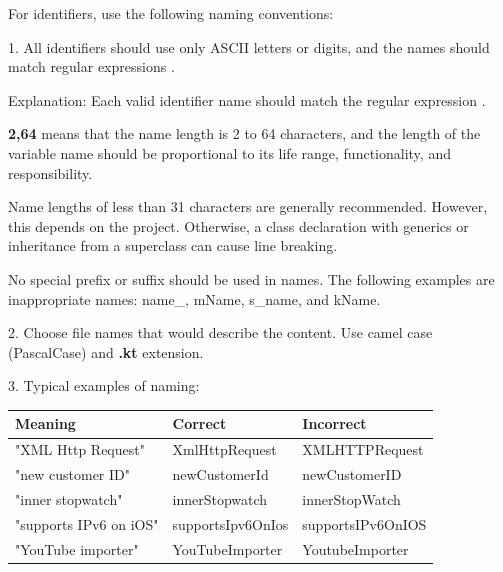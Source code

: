{{{{{{{{{{{{{{{{\label{sec:1.1.1}



For identifiers, use the following naming conventions:

1.	All identifiers should use only ASCII letters or digits, and the names should match regular expressions \textbf{}.

Explanation: Each valid identifier name should match the regular expression \textbf{}.

\textbf{{2,64}} means that the name length is 2 to 64 characters, and the length of the variable name should be proportional to its life range, functionality, and responsibility.

Name lengths of less than 31 characters are generally recommended. However, this depends on the project. Otherwise, a class declaration with generics or inheritance from a superclass can cause line breaking.

No special prefix or suffix should be used in names. The following examples are inappropriate names: name\_, mName, s\_name, and kName.



2.	Choose file names that would describe the content. Use camel case (PascalCase) and \textbf{.kt} extension.



3.	Typical examples of naming:



\begin{center}

\begin{tabular}{ |p{5.0cm}|p{5.0cm}|p{5.0cm}| }

\hline

Meaning&Correct&Incorrect\\

\hline

 "XML Http Request" & XmlHttpRequest & XMLHTTPRequest \\

 "new customer ID" & newCustomerId & newCustomerID \\

 "inner stopwatch" & innerStopwatch & innerStopWatch \\

 "supports IPv6 on iOS" & supportsIpv6OnIos & supportsIPv6OnIOS \\

 "YouTube importer" & YouTubeImporter & YoutubeImporter \\


\end{tabular}
\end{center}}}}}}}}}}}}}}}}}
